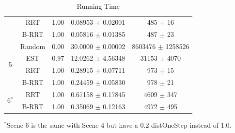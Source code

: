 \documentclass[11pt, oneside]{article}   	%
\begin{document}
\begin{table}
\begin{center}
\begin{tabular}{ | c | c | c | c | c |}
							& RRT 		& 1.00 		& 0.08953 $\pm$	0.02001    		& 485 		$\pm$	16	    	\\ 
 							& B-RRT		& 1.00		& 0.05816 $\pm$ 0.01385   		& 487 		$\pm$	23	    	\\ \hline
	\multirow{4}{*}{5}		& Random 	& 0.00 		& 30.0000 $\pm$	0.00002    		& 8603476	$\pm$	1258526  	\\ 
    						& EST		& 0.97		& 12.0262 $\pm$	4.56348     	& 31153 	$\pm$	4070	    \\ 
							& RRT 		& 1.00 		& 0.28915 $\pm$	0.07711     	& 973		$\pm$	15	     	\\ 
 							& B-RRT		& 1.00		& 0.24459 $\pm$	0.05830     	& 978 		$\pm$	21	     	\\ \hline
	\multirow{2}{*}{6$^*$}	& RRT 		& 1.00 		& 0.67158 $\pm$	0.17845     	& 4609		$\pm$	347	     	\\ 
 							& B-RRT		& 1.00		& 0.35069 $\pm$	0.12163     	& 4972 		$\pm$	495	     	\\ \hline						
    \end{tabular}
    \caption{Running Time}	
    \label{tab:running-time}					
    $^*$Scene 6 is the same with Scene 4 but have a 0.2 distOneStep instead of 1.0.
    \end{center}
\end{table}
\end{document}

